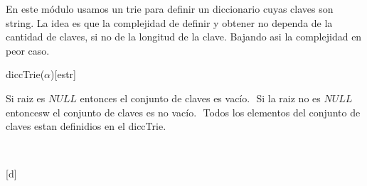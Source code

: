 \begin{Representacion}
  
  
	En este m\'odulo usamos un trie para definir un diccionario cuyas claves son string.
$ $\newline La idea es que la complejidad de definir y obtener no dependa de la cantidad de claves, si no de la longitud de la clave. Bajando asi la complejidad en peor caso.  
  
  \begin{Estructura}{diccTrie($\alpha$)}[estr]
    \begin{Tupla}[estr]
    \end{Tupla}

    \begin{Tupla}[nodo]
    \end{Tupla}
  \end{Estructura}


Si raiz es $NULL$ entonces el conjunto de claves es vac\'io. $ $\newline
Si la raiz no es $NULL$ entoncesw el conjunto de claves es no vac\'io. $ $\newline
Todos los elementos del conjunto de claves estan definidios en el diccTrie.
$ $\newline
 
  ~
 
  \AbsFc[]{}[d]{}


\end{Representacion}

